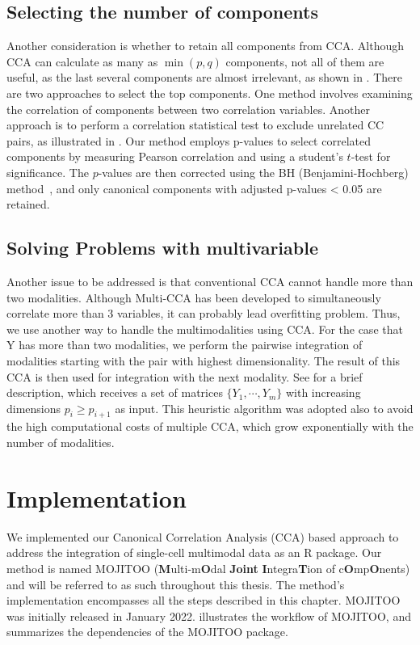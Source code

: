 \subsection{Selecting the number of components}
Another consideration is whether to retain all components from CCA. Although CCA can calculate as many as $\min(p, q)$ components, not all of them are useful, as the last several components are almost irrelevant, as shown in . There are two approaches to select the top components. One method involves examining the correlation of components between two correlation variables. Another approach is to perform a correlation statistical test to exclude unrelated CC pairs, as illustrated in . Our method employs p-values to select correlated components by measuring Pearson correlation and using a student's $t$-test for significance. The $p$-values are then corrected using the BH (Benjamini-Hochberg) method~\citep{benjamini1995controlling}, and only canonical components with adjusted p-values < 0.05 are retained.

\subsection{Solving Problems with multivariable}
Another issue to be addressed is that conventional CCA cannot handle more than two modalities. Although Multi-CCA has been developed to simultaneously correlate more than 3 variables, it can probably lead overfitting problem. Thus, we use another way to handle the multimodalities using CCA. For the case that Y has more than two modalities, we perform the pairwise integration of modalities starting with the pair with highest dimensionality. The result of this CCA is then used for integration
with the next modality. See  for a brief description, which receives a set of matrices $\{Y_{1},\cdots, Y_{m}\}$ with increasing dimensions $p_{i}\geq p_{i+1}$ as input. This heuristic algorithm was adopted also to avoid the high computational costs of multiple CCA, which grow exponentially with the number of modalities.

\section{Implementation}
\label{inte_methods:implementation}
We implemented our Canonical Correlation Analysis (CCA) based approach to address the integration of single-cell multimodal data as an R package. Our method is named MOJITOO (\textbf{M}ulti-m\textbf{O}dal \textbf{Joint} \textbf{I}ntegra\textbf{T}ion of c\textbf{O}mp\textbf{O}nents) and will be referred to as such throughout this thesis. The method's implementation encompasses all the steps described in this chapter. MOJITOO was initially released in January 2022.  illustrates the workflow of MOJITOO, and  summarizes the dependencies of the MOJITOO package.

